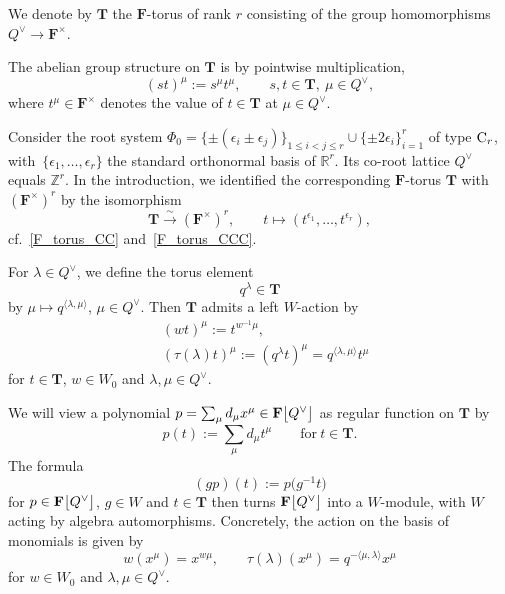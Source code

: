 \begin{Definition}\label{T_def}
We denote by $\mathbf{T}$ the $\mathbf{F}$-torus of rank $r$ consisting of the group homomorphisms~$Q^\vee\rightarrow\mathbf{F}^\times$.
\end{Definition}
The abelian group structure on $\mathbf{T}$ is by pointwise multiplication,
\[ (st)^\mu:=s^\mu t^\mu,\qquad s,t\in\mathbf{T},\ \mu\in Q^\vee,
\]
where $t^\mu\in\mathbf{F}^\times$ denotes the value of $t\in\mathbf{T}$ at $\mu\in Q^\vee$.
\begin{Remark}
Consider the root system $\Phi_0=\{\pm(\epsilon_i\pm\epsilon_j)\}_{1\leq i<j\leq r}\cup\{\pm 2\epsilon_i\}_{i=1}^r$ of type ${\rm C}_r$, with~$\{\epsilon_1,\dots,\epsilon_r\}$ the standard orthonormal basis of $\mathbb{R}^r$. Its co-root lattice $Q^\vee$
equals $\mathbb{Z}^r$. In the introduction, we identified the corresponding $\mathbf{F}$-torus $\mathbf{T}$ with $(\mathbf{F}^\times)^r$ by the isomorphism
\[
\mathbf{T}\overset{\sim}{\longrightarrow}(\mathbf{F}^\times)^r,\qquad t\mapsto (t^{\epsilon_1},\dots,t^{\epsilon_r}),
\]
cf.~\eqref{F_torus_CC} and~\eqref{F_torus_CCC}.
\end{Remark}


For $\lambda\in Q^\vee$, we define the torus element
\[
q^\lambda\in\mathbf{T}
\]
by $\mu\mapsto q^{\langle \lambda,\mu\rangle}$, $\mu\in Q^\vee$. Then $\mathbf{T}$ admits a left $W$-action by
\begin{align}
&(wt)^\mu:=t^{w^{-1}\mu},\nonumber\\
&(\tau(\lambda)t)^\mu:=(q^\lambda t)^\mu=q^{\langle\lambda,\mu\rangle}t^\mu\label{Waction}
\end{align}
for $t\in\mathbf{T}$, $w\in W_0$ and $\lambda,\mu\in Q^\vee$.

We will view a polynomial $p=\sum_\mu d_\mu x^\mu\in\mathbf{F}\smash{\bigl[Q^\vee\bigr]}$ as regular function on $\mathbf{T}$ by
\[
p(t):=\sum_\mu d_\mu t^\mu\qquad \text{for}\ t\in\mathbf{T}.
\]
The formula
\[
(gp)(t):=p\bigl(g^{-1}t\bigr)
\]
for $p\in\mathbf{F}\smash{\bigl[Q^\vee\bigr]}$, $g\in W$ and $t\in\mathbf{T}$ then turns $\mathbf{F}\smash{\bigl[Q^\vee\bigr]}$ into a $W$-module, with $W$ acting by algebra automorphisms.
Concretely, the action on the basis of monomials is given by
\begin{equation}\label{Wa}
w(x^\mu)=x^{w\mu},\qquad
\tau(\lambda)(x^\mu)=q^{-\langle\mu,\lambda\rangle}x^\mu
\end{equation}
for $w\in W_0$ and $\lambda,\mu\in Q^\vee$.

